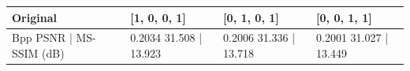 \begin{tabular}{llll}
\toprule
Original & [1, 0, 0, 1] & [0, 1, 0, 1] & [0, 0, 1, 1] \\
\midrule
Bpp PSNR | MS-SSIM (dB) & 0.2034 31.508 | 13.923 & 0.2006 31.336 | 13.718 & 0.2001 31.027 | 13.449 \\
\bottomrule
\end{tabular}
